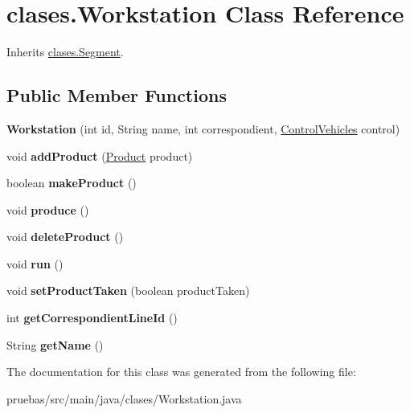 \hypertarget{classclases_1_1_workstation}{}\section{clases.\+Workstation Class Reference}
\label{classclases_1_1_workstation}


Inherits \mbox{\hyperlink{classclases_1_1_segment}{clases.\+Segment}}.

\subsection*{Public Member Functions}
\begin{DoxyCompactItemize}
\item 
\mbox{\label{classclases_1_1_workstation_a81abee084e638682e32fa9042a307f57}} 
{\bfseries Workstation} (int id, String name, int correspondient, \mbox{\hyperlink{classcontrol_1_1_control_vehicles}{Control\+Vehicles}} control)
\item 
\mbox{\label{classclases_1_1_workstation_aa5bcfb9b65f5aa9c78018e6eef6d1e15}} 
void {\bfseries add\+Product} (\mbox{\hyperlink{classclases_1_1_product}{Product}} product)
\item 
\mbox{\label{classclases_1_1_workstation_a7c939640ac4011d8ed63cab70edeb09a}} 
boolean {\bfseries make\+Product} ()
\item 
\mbox{\label{classclases_1_1_workstation_a2c5a4f165feee335d1aad454847c6544}} 
void {\bfseries produce} ()
\item 
\mbox{\label{classclases_1_1_workstation_a0fd86ec18770db6098c19c62fd4370d4}} 
void {\bfseries delete\+Product} ()
\item 
\mbox{\label{classclases_1_1_workstation_a163438e5a169b92b5fccee9f794558c3}} 
void {\bfseries run} ()
\item 
\mbox{\label{classclases_1_1_workstation_ace5b5928bee2bcbb8b4be09e8c94a7b1}} 
void {\bfseries set\+Product\+Taken} (boolean product\+Taken)
\item 
\mbox{\label{classclases_1_1_workstation_a608fe1411c5cd999e62649cf8d51c328}} 
int {\bfseries get\+Correspondient\+Line\+Id} ()
\item 
\mbox{\label{classclases_1_1_workstation_a26e1bf628712f17bb7c35b830a9aaa9a}} 
String {\bfseries get\+Name} ()
\end{DoxyCompactItemize}


The documentation for this class was generated from the following file\+:\begin{DoxyCompactItemize}
\item 
pruebas/src/main/java/clases/Workstation.\+java\end{DoxyCompactItemize}
